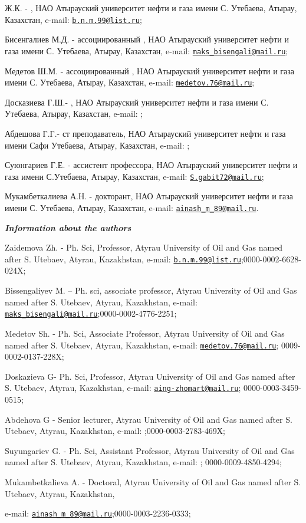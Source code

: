 Ж.К. - , НАО
Атырауский университет нефти и газа имени С. Утебаева, Атырау,
Казахстан, e-mail:
\href{mailto:b.n.m.99@list.ru}{\nolinkurl{b.n.m.99@list.ru}};

Бисенгалиев М.Д. -  ассоциированный
, НАО Атырауский университет нефти и газа имени С.
Утебаева, Атырау, Казахстан, e-mail:
\href{mailto:maks_bisengali@mail.ru}{\nolinkurl{maks\_bisengali@mail.ru}};

Медетов Ш.М. -  ассоциированный
, НАО Атырауский университет нефти и газа имени С.
Утебаева, Атырау, Казахстан, e-mail:
\href{mailto:medetov.76@mail.ru}{\nolinkurl{medetov.76@mail.ru}};

Досказиева Г.Ш.- , НАО
Атырауский университет нефти и газа имени С. Утебаева, Атырау,
Казахстан, e-mail:
\href{mailto:doskaziyeva.gulsin@gmail.com}{};

Абдешова Г.Г.- ст преподаватель, НАО Атырауский университет нефти и газа
имени Сафи Утебаева, Атырау, Казахстан, e-mail:
\href{mailto:gulya6320@mail.ru}{};

Суюнгариев Г.Е. -  ассистент профессора,
НАО Атырауский университет нефти и газа имени С.Утебаева, Атырау,
Казахстан, e-mail:
\href{mailto:S.gabit72@mail.ru}{\nolinkurl{S.gabit72@mail.ru}};

Мукамбеткалиева А.Н. - докторант, НАО Атырауский университет нефти и
газа имени С. Утебаева, Атырау, Казахстан, e-mail:
\href{mailto:ainash_m_89@mail.ru}{\nolinkurl{ainash\_m\_89@mail.ru}}.

\emph{{\bfseries Information about the authors}}

Zaidemova Zh. - Ph. Sci, Professor, Atyrau Uni󠀁versity of Oil and Gas
nam󠀁ed aft󠀁er S. Ute󠀁baev, Aty󠀁rau, Kaz󠀁akhstan, e-mail:
\href{mailto:b.n.m.99@list.ru}{\nolinkurl{b.n.m.99@list.ru}};0000-0002-6628-024X;

Bissengaliyev M. -- Ph. sci, associate professor, Atyrau Uni󠀁versity of
Oil and Gas nam󠀁ed aft󠀁er S. Ute󠀁baev, Aty󠀁rau, Kaz󠀁akhstan, e-mail:
\href{mailto:maks_bisengali@mail.ru}{\nolinkurl{maks\_bisengali@mail.ru}};0000-0002-4776-2251;

Medetov Sh. - Ph. Sci, Associate Professor, Atyrau Uni󠀁versity of Oil and
Gas nam󠀁ed aft󠀁er S. Ute󠀁baev, Aty󠀁rau, Kaz󠀁akhstan, e-mail:
\href{mailto:medetov.76@mail.ru}{\nolinkurl{medetov.76@mail.ru}};
0009-0002-0137-228X;

Doskazieva G- Ph. Sci, Professor, Atyrau Uni󠀁versity of Oil and Gas nam󠀁ed
aft󠀁er S. Ute󠀁baev, Aty󠀁rau, Kaz󠀁akhstan, e-mail:
\href{mailto:aing-zhomart@mail.ru}{\nolinkurl{aing-zhomart@mail.ru}};
0000-0003-3459-0515;

Abdehova G - Senior lecturer, Atyrau Uni󠀁versity of Oil and Gas
nam󠀁ed aft󠀁er S. Ute󠀁baev, Aty󠀁rau, Kaz󠀁akhstan, e-mail:
\href{mailto:gulya6320@mail.ru}{};0000-0003-2783-469Х;

Suyungariev G. - Ph. Sci, Assistant Professor, Atyrau
Uni󠀁versity of Oil and Gas nam󠀁ed aft󠀁er S. Ute󠀁baev, Aty󠀁rau, Kaz󠀁akhstan,
e-mail: \href{mailto:s.gabit72@mail.ru}{};
0000-0009-4850-4294;

Mukambetkalieva A. - Doctoral, Atyrau Uni󠀁versity of Oil and Gas nam󠀁ed
aft󠀁er S. Ute󠀁baev, Aty󠀁rau, Kaz󠀁akhstan,

e-mail:
\href{mailto:ainash_m_89@mail.ru}{\nolinkurl{ainash\_m\_89@mail.ru}};0000-0003-2236-0333;\